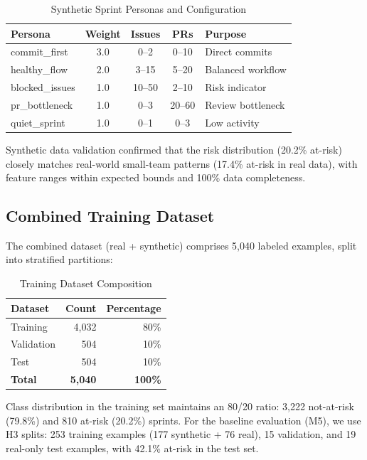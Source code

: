 \documentclass[journal]{IEEEtran}
\begin{document}
\begin{table}[htbp]
\centering
\caption{Synthetic Sprint Personas and Configuration}
\label{tab:personas}
\begin{tabular}{l|c|c|c|l}
\toprule
\textbf{Persona} & \textbf{Weight} & \textbf{Issues} & \textbf{PRs} & \textbf{Purpose} \\
\midrule
commit\_first & 3.0 & 0--2 & 0--10 & Direct commits \\
healthy\_flow & 2.0 & 3--15 & 5--20 & Balanced workflow \\
blocked\_issues & 1.0 & 10--50 & 2--10 & Risk indicator \\
pr\_bottleneck & 1.0 & 0--3 & 20--60 & Review bottleneck \\
quiet\_sprint & 1.0 & 0--1 & 0--3 & Low activity \\
\bottomrule
\end{tabular}
\end{table}

Synthetic data validation confirmed that the risk distribution (20.2\% at-risk) closely matches real-world small-team patterns (17.4\% at-risk in real data), with feature ranges within expected bounds and 100\% data completeness.

\subsection{Combined Training Dataset}

The combined dataset (real + synthetic) comprises 5,040 labeled examples, split into stratified partitions:

\begin{table}[htbp]
\centering
\caption{Training Dataset Composition}
\label{tab:dataset_split}
\begin{tabular}{l|r|r}
\toprule
\textbf{Dataset} & \textbf{Count} & \textbf{Percentage} \\
\midrule
Training & 4,032 & 80\% \\
Validation & 504 & 10\% \\
Test & 504 & 10\% \\
\midrule
\textbf{Total} & \textbf{5,040} & \textbf{100\%} \\
\bottomrule
\end{tabular}
\end{table}

Class distribution in the training set maintains an 80/20 ratio: 3,222 not-at-risk (79.8\%) and 810 at-risk (20.2\%) sprints. For the baseline evaluation (M5), we use H3 splits: 253 training examples (177 synthetic + 76 real), 15 validation, and 19 real-only test examples, with 42.1\% at-risk in the test set.
\end{document}
